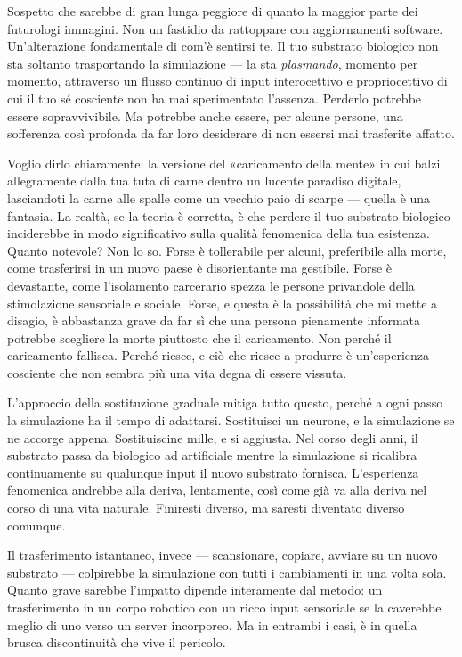 \documentclass[11pt, twoside, openright]{book}
\begin{document}
Sospetto che sarebbe di gran lunga peggiore di quanto la maggior parte dei futurologi immagini. Non un fastidio da rattoppare con aggiornamenti software. Un'alterazione fondamentale di com'è sentirsi te. Il tuo substrato biologico non sta soltanto trasportando la simulazione --- la sta \textit{plasmando}, momento per momento, attraverso un flusso continuo di input interocettivo e propriocettivo di cui il tuo sé cosciente non ha mai sperimentato l'assenza. Perderlo potrebbe essere sopravvivibile. Ma potrebbe anche essere, per alcune persone, una sofferenza così profonda da far loro desiderare di non essersi mai trasferite affatto.

Voglio dirlo chiaramente: la versione del «caricamento della mente» in cui balzi allegramente dalla tua tuta di carne dentro un lucente paradiso digitale, lasciandoti la carne alle spalle come un vecchio paio di scarpe --- quella è una fantasia. La realtà, se la teoria è corretta, è che perdere il tuo substrato biologico inciderebbe in modo significativo sulla qualità fenomenica della tua esistenza. Quanto notevole? Non lo so. Forse è tollerabile per alcuni, preferibile alla morte, come trasferirsi in un nuovo paese è disorientante ma gestibile. Forse è devastante, come l'isolamento carcerario spezza le persone privandole della stimolazione sensoriale e sociale. Forse, e questa è la possibilità che mi mette a disagio, è abbastanza grave da far sì che una persona pienamente informata potrebbe scegliere la morte piuttosto che il caricamento. Non perché il caricamento fallisca. Perché riesce, e ciò che riesce a produrre è un'esperienza cosciente che non sembra più una vita degna di essere vissuta.

L'approccio della sostituzione graduale mitiga tutto questo, perché a ogni passo la simulazione ha il tempo di adattarsi. Sostituisci un neurone, e la simulazione se ne accorge appena. Sostituiscine mille, e si aggiusta. Nel corso degli anni, il substrato passa da biologico ad artificiale mentre la simulazione si ricalibra continuamente su qualunque input il nuovo substrato fornisca. L'esperienza fenomenica andrebbe alla deriva, lentamente, così come già va alla deriva nel corso di una vita naturale. Finiresti diverso, ma saresti diventato diverso comunque.

Il trasferimento istantaneo, invece --- scansionare, copiare, avviare su un nuovo substrato --- colpirebbe la simulazione con tutti i cambiamenti in una volta sola. Quanto grave sarebbe l'impatto dipende interamente dal metodo: un trasferimento in un corpo robotico con un ricco input sensoriale se la caverebbe meglio di uno verso un server incorporeo. Ma in entrambi i casi, è in quella brusca discontinuità che vive il pericolo.
\end{document}
